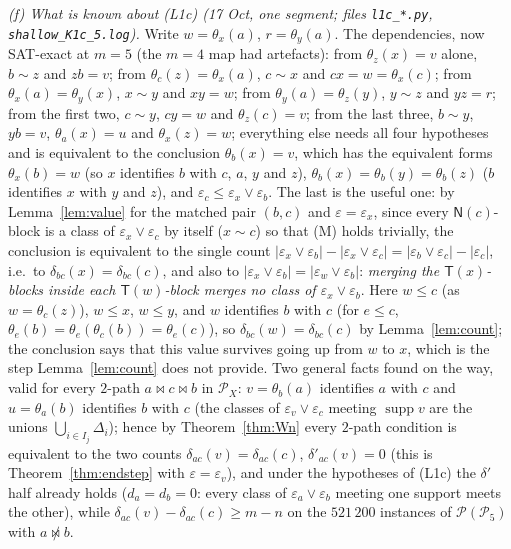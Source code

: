 \documentclass[11pt]{amsart}
\theoremstyle{definition}
\renewcommand{\P}{\mathcal{P}}
\newcommand{\supp}{\operatorname{supp}}
\newcommand{\T}{\mathsf{T}}
\newcommand{\N}{\mathsf{N}}
\newcommand{\mt}{\bowtie}   %
\begin{document}
\emph{(f) What is known about (L1c) (17 Oct, one segment; files \texttt{l1c\_*.py}, \texttt{shallow\_K1c\_5.log}).} Write $w=\theta_x(a)$, $r=\theta_y(a)$. The dependencies, now SAT-exact at $m=5$ (the $m=4$ map had artefacts): from $\theta_z(x)=v$ alone, $b\sim z$ and $zb=v$; from $\theta_c(z)=\theta_x(a)$, $c\sim x$ and $cx=w=\theta_x(c)$; from $\theta_x(a)=\theta_y(x)$, $x\sim y$ and $xy=w$; from $\theta_y(a)=\theta_z(y)$, $y\sim z$ and $yz=r$; from the first two, $c\sim y$, $cy=w$ and $\theta_z(c)=v$; from the last three, $b\sim y$, $yb=v$, $\theta_a(x)=u$ and $\theta_x(z)=w$; everything else needs all four hypotheses and is equivalent to the conclusion $\theta_b(x)=v$, which has the equivalent forms $\theta_x(b)=w$ (so $x$ identifies $b$ with $c$, $a$, $y$ and $z$), $\theta_b(x)=\theta_b(y)=\theta_b(z)$ ($b$ identifies $x$ with $y$ and $z$), and $\varepsilon_c\le\varepsilon_x\vee\varepsilon_b$. The last is the useful one: by Lemma~\ref{lem:value} for the matched pair $(b,c)$ and $\varepsilon=\varepsilon_x$, since every $\N(c)$-block is a class of $\varepsilon_x\vee\varepsilon_c$ by itself ($x\sim c$) so that (M) holds trivially, the conclusion is equivalent to the single count $|\varepsilon_x\vee\varepsilon_b|-|\varepsilon_x\vee\varepsilon_c|=|\varepsilon_b\vee\varepsilon_c|-|\varepsilon_c|$, i.e.\ to $\delta_{bc}(x)=\delta_{bc}(c)$, and also to $|\varepsilon_x\vee\varepsilon_b|=|\varepsilon_w\vee\varepsilon_b|$: \emph{merging the $\T(x)$-blocks inside each $\T(w)$-block merges no class of $\varepsilon_x\vee\varepsilon_b$}. Here $w\le c$ (as $w=\theta_c(z)$), $w\le x$, $w\le y$, and $w$ identifies $b$ with $c$ (for $e\le c$, $\theta_e(b)=\theta_e(\theta_c(b))=\theta_e(c)$), so $\delta_{bc}(w)=\delta_{bc}(c)$ by Lemma~\ref{lem:count}; the conclusion says that this value survives going up from $w$ to $x$, which is the step Lemma~\ref{lem:count} does not provide. Two general facts found on the way, valid for every $2$-path $a\mt c\mt b$ in $\P_X$: $v=\theta_b(a)$ identifies $a$ with $c$ and $u=\theta_a(b)$ identifies $b$ with $c$ (the classes of $\varepsilon_v\vee\varepsilon_c$ meeting $\supp v$ are the unions $\bigcup_{i\in I_j}\Delta_i$); hence by Theorem~\ref{thm:Wn} every $2$-path condition is equivalent to the two counts $\delta_{ac}(v)=\delta_{ac}(c)$, $\delta'_{ac}(v)=0$ (this is Theorem~\ref{thm:endstep} with $\varepsilon=\varepsilon_v$), and under the hypotheses of (L1c) the $\delta'$ half already holds ($d_a=d_b=0$: every class of $\varepsilon_a\vee\varepsilon_b$ meeting one support meets the other), while $\delta_{ac}(v)-\delta_{ac}(c)\ge m-n$ on the $521\,200$ instances of $\P(\P_5)$ with $a\not\mt b$.
\end{document}
